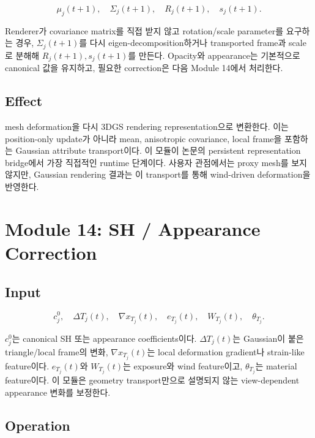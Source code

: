 \documentclass[11pt,a4paper]{article}
\begin{document}
\begin{equation}
\mu_j(t+1),\quad \Sigma_j(t+1),\quad R_j(t+1),\quad s_j(t+1).
\end{equation}

Renderer가 covariance matrix를 직접 받지 않고 rotation/scale parameter를 요구하는 경우, $\Sigma_j(t+1)$를 다시 eigen-decomposition하거나 transported frame과 scale로 분해해 $R_j(t+1),s_j(t+1)$를 만든다.
Opacity와 appearance는 기본적으로 canonical 값을 유지하고, 필요한 correction은 다음 Module 14에서 처리한다.

\subsection*{Effect}

mesh deformation을 다시 3DGS rendering representation으로 변환한다. 이는 position-only update가 아니라 mean, anisotropic covariance, local frame을 포함하는 Gaussian attribute transport이다.
이 모듈이 논문의 persistent representation bridge에서 가장 직접적인 runtime 단계이다.
사용자 관점에서는 proxy mesh를 보지 않지만, Gaussian rendering 결과는 이 transport를 통해 wind-driven deformation을 반영한다.

\section{Module 14: SH / Appearance Correction}

\subsection*{Input}

\begin{equation}
c_j^0,\quad \Delta T_j(t),\quad \nabla x_{T_j}(t),\quad e_{T_j}(t),\quad W_{T_j}(t),\quad \theta_{T_j}.
\end{equation}

$c_j^0$는 canonical SH 또는 appearance coefficients이다.
$\Delta T_j(t)$는 Gaussian이 붙은 triangle/local frame의 변화, $\nabla x_{T_j}(t)$는 local deformation gradient나 strain-like feature이다.
$e_{T_j}(t)$와 $W_{T_j}(t)$는 exposure와 wind feature이고, $\theta_{T_j}$는 material feature이다.
이 모듈은 geometry transport만으로 설명되지 않는 view-dependent appearance 변화를 보정한다.

\subsection*{Operation}
\end{document}
